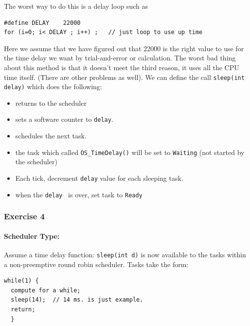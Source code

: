 

The worst way to do this is a delay loop such as
\begin{verbatim}
#define DELAY    22000
for (i=0; i< DELAY ; i++) ;   // just loop to use up time
\end{verbatim}


Here we assume that we have figured out that 22000 is the right value to
use for the time delay we want by trial-and-error or calculation.   The
worst bad thing about this method is that it doesn't meet the third
reason, it uses all the CPU time itself.  (There are other problems as
well). We can define
the call {\tt sleep(int delay)} which does the following:
 

%
%
\begin{itemize}
        \item returns to the scheduler
        \item sets a software counter to {\tt delay}.  
        \item schedules the next task.
        \item the task which called {\tt OS\_TimeDelay()} will be set to 
         {\tt Waiting} (not started by the scheduler)
         \item Each tick, decrement {\tt delay} value for each sleeping task. 
        \item when the {\tt delay } is over, set task to {\tt Ready}
\end{itemize}


\subsubsection{Exercise 4}

\paragraph{Scheduler Type:} Assume a time delay function: {\tt sleep(int d)} is now available to the tasks 
within a non-preemptive round robin scheduler.  Tasks take the form:
\begin{verbatim}
while(1) {
  compute for a while;
  sleep(14);  // 14 ms. is just example.
  return;
  }
\end{verbatim} 
